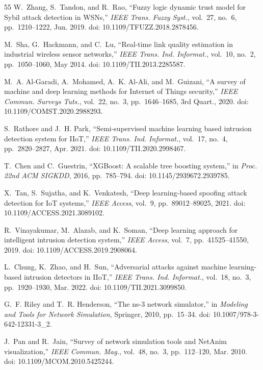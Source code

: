 \documentclass[journal]{IEEEtran}
\begin{document}
\begin{thebibliography}{55}
W.~Zhang, S.~Tandon, and R.~Rao, ``Fuzzy logic dynamic trust model for Sybil attack detection in WSNs,'' \textit{IEEE Trans. Fuzzy Syst.}, vol.~27, no.~6, pp.~1210--1222, Jun. 2019. doi: 10.1109/TFUZZ.2018.2878456.

M.~Sha, G.~Hackmann, and C.~Lu, ``Real-time link quality estimation in industrial wireless sensor networks,'' \textit{IEEE Trans. Ind. Informat.}, vol.~10, no.~2, pp.~1050--1060, May 2014. doi: 10.1109/TII.2013.2285587.

M.~A. Al-Garadi, A.~Mohamed, A.~K. Al-Ali, and M.~Guizani, ``A survey of machine and deep learning methods for Internet of Things security,'' \textit{IEEE Commun. Surveys Tuts.}, vol.~22, no.~3, pp.~1646--1685, 3rd Quart., 2020. doi: 10.1109/COMST.2020.2988293.

S.~Rathore and J.~H. Park, ``Semi-supervised machine learning based intrusion detection system for IIoT,'' \textit{IEEE Trans. Ind. Informat.}, vol.~17, no.~4, pp.~2820--2827, Apr. 2021. doi: 10.1109/TII.2020.2998467.

T.~Chen and C.~Guestrin, ``XGBoost: A scalable tree boosting system,'' in \textit{Proc. 22nd ACM SIGKDD}, 2016, pp.~785--794. doi: 10.1145/2939672.2939785.

X.~Tan, S.~Sujatha, and K.~Venkatesh, ``Deep learning-based spoofing attack detection for IoT systems,'' \textit{IEEE Access}, vol.~9, pp.~89012--89025, 2021. doi: 10.1109/ACCESS.2021.3089102.

R.~Vinayakumar, M.~Alazab, and K.~Soman, ``Deep learning approach for intelligent intrusion detection system,'' \textit{IEEE Access}, vol.~7, pp.~41525--41550, 2019. doi: 10.1109/ACCESS.2019.2908064.

L.~Chung, K.~Zhao, and H.~Sun, ``Adversarial attacks against machine learning-based intrusion detectors in IIoT,'' \textit{IEEE Trans. Ind. Informat.}, vol.~18, no.~3, pp.~1920--1930, Mar. 2022. doi: 10.1109/TII.2021.3099850.

G.~F. Riley and T.~R. Henderson, ``The ns-3 network simulator,'' in \textit{Modeling and Tools for Network Simulation}, Springer, 2010, pp.~15--34. doi: 10.1007/978-3-642-12331-3_2.

J.~Pan and R.~Jain, ``Survey of network simulation tools and NetAnim visualization,'' \textit{IEEE Commun. Mag.}, vol.~48, no.~3, pp.~112--120, Mar. 2010. doi: 10.1109/MCOM.2010.5425244.


\end{thebibliography}
\end{document}
